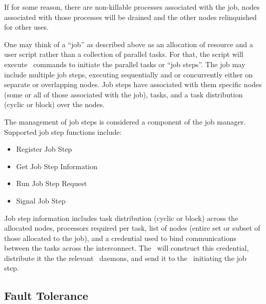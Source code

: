 If for some reason, there are non-killable processes associated with 
the job, nodes associated with those processes will be drained and 
the other nodes relinquished for other uses.

One may think of a ``job'' as described above as an allocation of resource 
and a user script rather than a collection of parallel tasks. For that, 
the script will execute \srun\ commands to initiate the parallel tasks 
or ``job steps''. The job may include multiple job steps, executing 
sequentially and or concurrently either on separate or overlapping nodes. 
Job steps have associated with them specific nodes (some or all of those 
associated with the job), tasks, and a task distribution (cyclic or 
block) over the nodes. 

The management of job steps is considered a component of the job 
manager. Supported job step functions include:
\begin{itemize}
\item Register Job Step
\item Get Job Step Information
\item Run Job Step Request
\item Signal Job Step
\end{itemize}
Job step information includes task distribution (cyclic or block) 
across the allocated nodes, processors required per task, list of 
nodes (entire set or subset of those allocated to the job), and a 
credential used to bind communications between the tasks across 
the interconnect. The \slurmctld\ will construct this credential, 
distribute it the the relevant \slurmd\ daemons, and send it to 
the \srun\ initiating the job step.

%

\subsection{Fault Tolerance}

